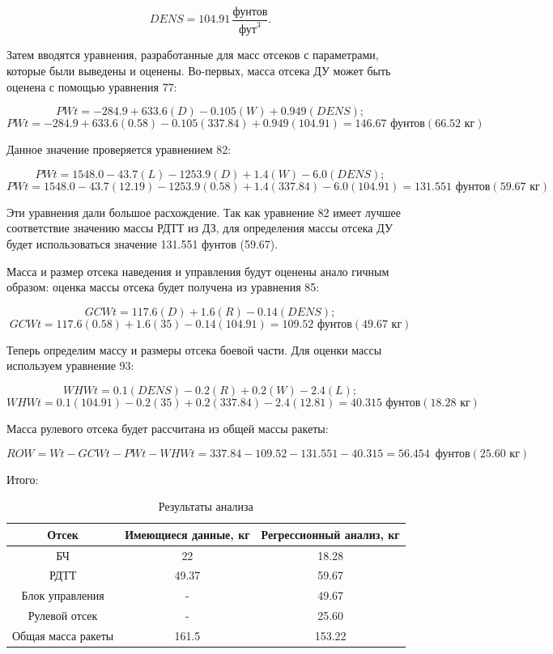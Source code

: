 \documentclass[a4paper,12pt]{report}
\begin{document}
\[ \textit{DENS} = 104.91 \, \frac{\text{фунтов}}{\text{фут}^3} . \]

Затем вводятся уравнения, разработанные для масс отсеков с параметрами, которые были выведены и оценены. Во-первых, масса отсека ДУ
может быть оценена с помощью уравнения 77:

\[ \textit{PWt} = -284.9 + 633.6(D) - 0.105(W) + 0.949(\textit{DENS}); \]
\[ \textit{PWt} = -284.9 + 633.6(0.58) - 0.105(337.84) + 0.949(104.91) = 146.67 \text{ фунтов}(66.52 \text{ кг})\]


Данное значение проверяется уравнением 82:

\[ \textit{PWt} = 1548.0 - 43.7(L) - 1253.9(D) + 1.4(W) - 6.0(\textit{DENS}); \]
\[ \textit{PWt} = 1548.0 - 43.7(12.19) - 1253.9(0.58) + 1.4(337.84) - 6.0(104.91) = 131.551 \text{ фунтов}(59.67 \text{ кг}) \]

Эти уравнения дали большое расхождение. Так как уравнение
82 имеет лучшее соответствие значению массы РДТТ из ДЗ, для определения
массы отсека ДУ будет использоваться значение 131.551 фунтов (59.67).

 Масса и размер отсека наведения и управления будут оценены анало
гичным образом: оценка массы отсека будет получена из уравнения 85:

\[ GCWt = 117.6(D) + 1.6(R) - 0.14(\textit{DENS}); \]
\[ GCWt = 117.6(0.58) + 1.6(35) - 0.14(104.91) = 109.52 \text{ фунтов}( 49.67\text{ кг}) \]


Теперь определим массу и размеры отсека боевой части. Для оценки массы используем уравнение 93:

\[ WHWt = 0.1(DENS) - 0.2(R) + 0.2(W) - 2.4(L); \]
\[ WHWt = 0.1(104.91) - 0.2(35) + 0.2(337.84) - 2.4(12.81) = 40.315 \text{ фунтов}( 18.28\text{ кг}) \]


Масса рулевого отсека будет рассчитана из общей массы ракеты:

\[
ROW = Wt - GCWt - PWt - WHWt = 337.84  - 109.52 - 131.551 - 40.315 = 56.454 \, \text{ фунтов}( 25.60\text{ кг})
\]

Итого: 
\captionsetup[table]{position=top, singlelinecheck=false, justification=raggedleft}
\begin{table}[H]
\caption{Результаты анализа}
\label{tab:three_columns}
\centering
\begin{tabular}{|c|c|c|}
\hline
\textbf{Отсек} & \textbf{Имеющиеся данные, кг} & \textbf{Регрессионный анализ, кг} \\
\hline
БЧ & 22 & 18.28 \\
\hline
РДТТ & 49.37 & 59.67 \\
\hline
Блок управления & - & 49.67 \\
\hline
Рулевой отсек & - & 25.60 \\
\hline
Общая масса ракеты & 161.5 & 153.22 \\
\hline
\end{tabular}
\end{table}
\end{document}
